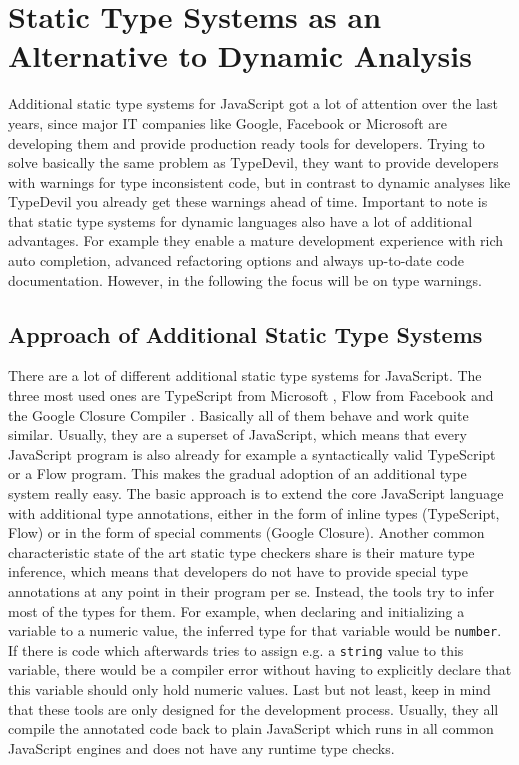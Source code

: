 \documentclass[runningheads,a4paper]{llncs}
\begin{document}
\section{Static Type Systems as an Alternative to Dynamic Analysis}

Additional static type systems for JavaScript got a lot of attention over the last years, since major IT companies like Google, Facebook or Microsoft are developing them and provide production ready tools for developers.
Trying to solve basically the same problem as TypeDevil, they want to provide developers with warnings for type inconsistent code, but in contrast to dynamic analyses like TypeDevil you already get these warnings ahead of time.
Important to note is that static type systems for dynamic languages also have a lot of additional advantages.
For example they enable a mature development experience with rich auto completion, advanced refactoring options and always up-to-date code documentation.
However, in the following the focus will be on type warnings.

\subsection{Approach of Additional Static Type Systems} \label{staticTypeSystems}
There are a lot of different additional static type systems for JavaScript.
The three most used ones are TypeScript from Microsoft \cite{TypeScript}, Flow from Facebook \cite{Flow} and the Google Closure Compiler \cite{ClosureComiler}.
Basically all of them behave and work quite similar.
Usually, they are a superset of JavaScript, which means that every JavaScript program is also already for example a syntactically valid TypeScript or a Flow program.
This makes the gradual adoption of an additional type system really easy.
The basic approach is to extend the core JavaScript language with additional type annotations, either in the form of inline types (TypeScript, Flow) or in the form of special comments (Google Closure).
Another common characteristic state of the art static type checkers share is their mature type inference, which means that developers do not have to provide special type annotations at any point in their program per se.
Instead, the tools try to infer most of the types for them. 
For example, when declaring and initializing a variable to a numeric value, the inferred type for that variable would be \lstinline[columns=fixed]{number}.
If there is code which afterwards tries to assign e.g. a \lstinline[columns=fixed]{string} value to this variable, there would be a compiler error without having to explicitly declare that this variable should only hold numeric values.
Last but not least, keep in mind that these tools are only designed for the development process.
Usually, they all compile the annotated code back to plain JavaScript which runs in all common JavaScript engines and does not have any runtime type checks.
\end{document}
